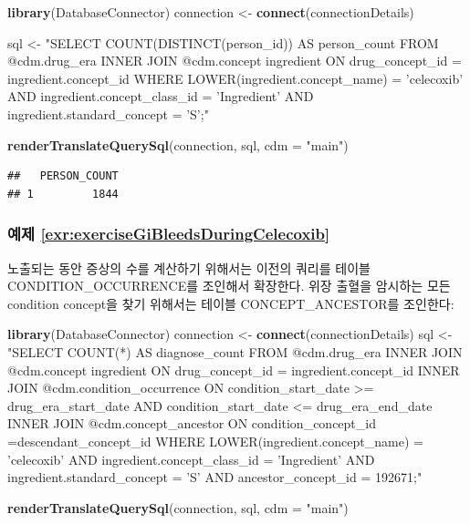 \documentclass[11pt]{book}
\newenvironment{Shaded}{\begin{snugshade}}{\end{snugshade}}
\newcommand{\KeywordTok}[1]{\textcolor[rgb]{0.13,0.29,0.53}{\textbf{#1}}}
\newcommand{\DataTypeTok}[1]{\textcolor[rgb]{0.13,0.29,0.53}{#1}}
\newcommand{\StringTok}[1]{\textcolor[rgb]{0.31,0.60,0.02}{#1}}
\newcommand{\NormalTok}[1]{#1}
\theoremstyle{definition}
\theoremstyle{definition}
\theoremstyle{definition}
\theoremstyle{remark}
\begin{document}
\begin{Shaded}
\begin{Highlighting}[]
\KeywordTok{library}\NormalTok{(DatabaseConnector)}
\NormalTok{connection <-}\StringTok{ }\KeywordTok{connect}\NormalTok{(connectionDetails)}

\NormalTok{sql <-}\StringTok{ "SELECT COUNT(DISTINCT(person_id)) AS person_count}
\StringTok{FROM @cdm.drug_era}
\StringTok{INNER JOIN @cdm.concept ingredient}
\StringTok{  ON drug_concept_id = ingredient.concept_id}
\StringTok{WHERE LOWER(ingredient.concept_name) = 'celecoxib'}
\StringTok{  AND ingredient.concept_class_id = 'Ingredient'}
\StringTok{  AND ingredient.standard_concept = 'S';"}

\KeywordTok{renderTranslateQuerySql}\NormalTok{(connection, sql, }\DataTypeTok{cdm =} \StringTok{"main"}\NormalTok{)}
\end{Highlighting}
\end{Shaded}

\begin{verbatim}
##   PERSON_COUNT
## 1         1844
\end{verbatim}

\subsubsection*{예제
\ref{exr:exerciseGiBleedsDuringCelecoxib}}\label{-refexrexercisegibleedsduringcelecoxib}

노출되는 동안 증상의 수를 계산하기 위해서는 이전의 쿼리를 테이블
CONDITION\_OCCURRENCE를 조인해서 확장한다. 위장 출혈을 암시하는 모든
condition concept을 찾기 위해서는 테이블 CONCEPT\_ANCESTOR를 조인한다:

\begin{Shaded}
\begin{Highlighting}[]
\KeywordTok{library}\NormalTok{(DatabaseConnector)}
\NormalTok{connection <-}\StringTok{ }\KeywordTok{connect}\NormalTok{(connectionDetails)}
\NormalTok{sql <-}\StringTok{ "SELECT COUNT(*) AS diagnose_count}
\StringTok{FROM @cdm.drug_era}
\StringTok{INNER JOIN @cdm.concept ingredient}
\StringTok{  ON drug_concept_id = ingredient.concept_id}
\StringTok{INNER JOIN @cdm.condition_occurrence}
\StringTok{  ON condition_start_date >= drug_era_start_date}
\StringTok{    AND condition_start_date <= drug_era_end_date}
\StringTok{INNER JOIN @cdm.concept_ancestor }
\StringTok{  ON condition_concept_id =descendant_concept_id}
\StringTok{WHERE LOWER(ingredient.concept_name) = 'celecoxib'}
\StringTok{  AND ingredient.concept_class_id = 'Ingredient'}
\StringTok{  AND ingredient.standard_concept = 'S'}
\StringTok{  AND ancestor_concept_id = 192671;"}

\KeywordTok{renderTranslateQuerySql}\NormalTok{(connection, sql, }\DataTypeTok{cdm =} \StringTok{"main"}\NormalTok{)}
\end{Highlighting}
\end{Shaded}
\end{document}
